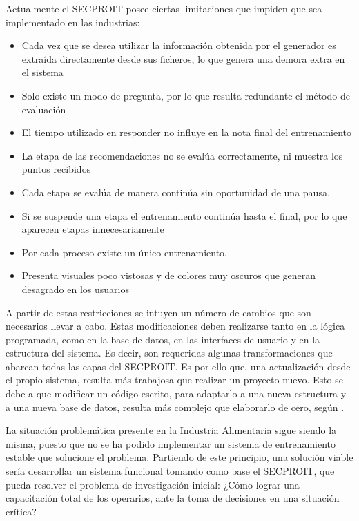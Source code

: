 Actualmente el SECPROIT posee ciertas limitaciones que impiden que sea implementado en las industrias:
\begin{itemize}
\item Cada vez que se desea utilizar la información obtenida por el generador es extraída directamente desde sus ficheros, lo que genera una demora extra en el sistema
\item Solo existe un modo de pregunta, por lo que resulta redundante el método de evaluación
\item El tiempo utilizado en responder no influye en la nota final del entrenamiento
\item La etapa de las recomendaciones no se evalúa correctamente, ni muestra los puntos recibidos
\item Cada etapa se evalúa de manera continúa sin oportunidad de una pausa.
\item Si se suspende una etapa el entrenamiento continúa hasta el final, por lo que aparecen etapas innecesariamente
\item Por cada proceso existe un único entrenamiento.
\item Presenta visuales poco vistosas y de colores muy oscuros que generan desagrado en los usuarios
\end{itemize}

A partir de estas restricciones se intuyen un número de cambios que son necesarios llevar a cabo. Estas modificaciones deben realizarse tanto en la lógica programada, como en la base de datos, en las interfaces de usuario y en la estructura del sistema. Es decir, son requeridas algunas transformaciones que abarcan todas las capas del SECPROIT.
Es por ello que, una actualización desde el propio sistema, resulta más trabajosa que realizar un proyecto nuevo. Esto se debe a que modificar un código escrito, para adaptarlo a una nueva estructura y a una nueva base de datos, resulta más complejo que elaborarlo de cero, según \cite{Plecka2013}.


La situación problemática presente en la Industria Alimentaria sigue siendo la misma, puesto que no se ha podido implementar un sistema de entrenamiento estable que solucione el problema. Partiendo de este principio, una solución viable sería desarrollar un sistema funcional tomando como base el SECPROIT, que pueda resolver el problema de investigación inicial: 
¿Cómo lograr una capacitación total de los operarios, ante la toma de decisiones en una situación crítica?

